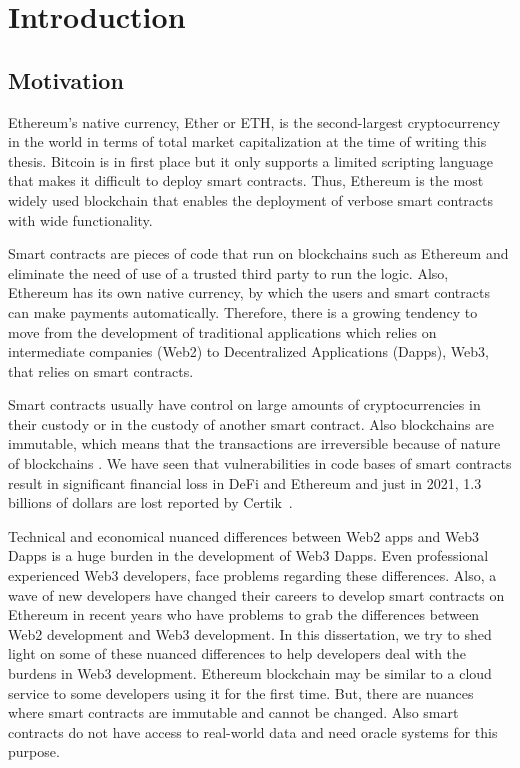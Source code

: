 \chapter{Introduction}


\section{Motivation}
Ethereum's native currency, Ether or ETH, is the second-largest cryptocurrency in the world in terms of total market capitalization at the time of writing this thesis. Bitcoin is in first place but it only supports a limited scripting language that makes it difficult to deploy smart contracts. Thus, Ethereum is the most widely used blockchain that enables the deployment of verbose smart contracts with wide functionality. 

Smart contracts are pieces of code that run on blockchains such as Ethereum and eliminate the need of use of a trusted third party to run the logic. Also, Ethereum has its own native currency, by which the users and smart contracts can make payments automatically.
Therefore, there is a growing tendency to move from the development of traditional applications which relies on intermediate companies (Web2) to Decentralized Applications (Dapps), Web3, that relies on smart contracts. 
 
Smart contracts usually have control on large amounts of cryptocurrencies in their custody or in the custody of another smart contract. Also blockchains are immutable, which means that the transactions are irreversible because of nature of blockchains . 
We have seen that vulnerabilities in code bases of smart contracts result in significant financial loss in DeFi and Ethereum and just in 2021, 1.3 billions of dollars are lost reported by Certik~\cite{certikReport}.


Technical and economical nuanced differences between Web2 apps and Web3 Dapps is a huge burden in the development of Web3 Dapps. Even professional experienced Web3 developers, face problems regarding these differences. Also, a wave of new developers have changed their careers to develop smart contracts on Ethereum in recent years who have problems to grab the differences between Web2 development and Web3 development. In this dissertation, we try to shed light on some of these nuanced differences to help developers deal with the burdens in Web3 development. Ethereum blockchain may be similar to a cloud service to some developers using it for the first time. But, there are nuances where smart contracts are immutable and cannot be changed. Also smart contracts do not have access to real-world data and need oracle systems for this purpose.


